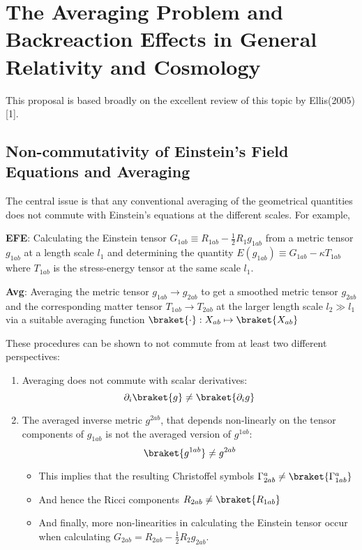 \hypertarget{the-averaging-problem-and-backreaction-effects-in-general-relativity-and-cosmology}{%
\section{The Averaging Problem and Backreaction Effects in General
Relativity and
Cosmology}\label{the-averaging-problem-and-backreaction-effects-in-general-relativity-and-cosmology}}

This proposal is based broadly on the excellent review of this topic by
Ellis(2005){[}1{]}.

\hypertarget{non-commutativity-of-einsteins-field-equations-and-averaging}{%
\subsection{Non-commutativity of Einstein's Field Equations and
Averaging}\label{non-commutativity-of-einsteins-field-equations-and-averaging}}

The central issue is that any conventional averaging of the geometrical
quantities does not commute with Einstein's equations at the different
scales. For example,

\textbf{EFE}: Calculating the Einstein tensor
\(G_{1ab}\equiv R_{1ab}-\frac{1}{2}R_1g_{1ab}\) from a metric tensor
\(g_{1ab}\) at a length scale \(l_1\) and determining the quantity
\(E(g_{1ab})\equiv G_{1ab} - \kappa T_{1ab}\) where \(T_{1ab}\) is the
stress-energy tensor at the same scale \(l_1\).

\textbf{Avg}: Averaging the metric tensor
\(g_{1ab} \rightarrow g_{2ab}\) to get a smoothed metric tensor
\(g_{2ab}\) and the corresponding matter tensor
\(T_{1ab} \rightarrow T_{2ab}\) at the larger length scale
\(l_2 \gg l_1\) via a suitable averaging function
\(\braket{\cdot}: X_{ab} \mapsto \braket{X_{ab}}\)

These procedures can be shown to not commute from at least two different
perspectives:

\begin{enumerate}
\def\labelenumi{\arabic{enumi}.}
\tightlist
\item
  Averaging does not commute with scalar derivatives:
  \[\partial_i\braket{g}\neq\braket{\partial_ig}\]
\item
  The averaged inverse metric \(g^{2ab}\), that depends non-linearly on
  the tensor components of \(g_{1ab}\) is not the averaged version of
  \(g^{1ab}\): \[ \braket{g^{1ab}}\neq g^{2ab}\]

  \begin{itemize}
  \tightlist
  \item
    This implies that the resulting Christoffel symbols
    \(\Gamma^{a}_{2ab}\neq\braket{\Gamma^{a}_{1ab}}\)
  \item
    And hence the Ricci components \(R_{2ab}\neq\braket{R_{1ab}}\)
  \item
    And finally, more non-linearities in calculating the Einstein tensor
    occur when calculating \(G_{2ab}=R_{2ab}-\frac{1}{2}R_2g_{2ab}\).
  \end{itemize}
\end{enumerate}

